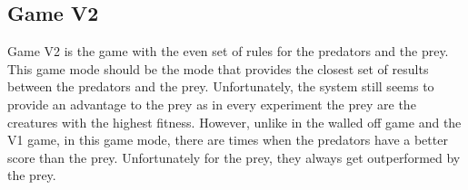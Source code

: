 \subsection{Game V2}
Game V2 is the game with the even set of rules for the predators and the prey. This game mode should be the mode that provides the closest set of results between the predators and the prey. Unfortunately, the system still seems to provide an advantage to the prey as in every experiment the prey are the creatures with the highest fitness. However, unlike in the walled off game and the V1 game, in this game mode, there are times when the predators have a better score than the prey. Unfortunately for the prey, they always get outperformed by the prey.